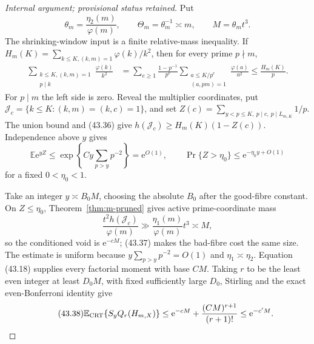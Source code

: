 \documentclass[10pt,reqno]{amsart}
\theoremstyle{definition}
\newcommand{\e}{\mathrm e}
\newcommand{\1}{\mathbf 1}
\begin{document}
\begin{proof}[Internal argument; provisional status retained]
Put
\[
 \theta_m=\frac{\eta_2(m)}{\varphi(m)},\qquad
 \Theta_m=\theta_m^{-1}\asymp m,\qquad M=\theta_mt^3.
\]
The shrinking-window input is a finite relative-mass inequality.  If
$H_m(K)=\sum_{k\leq K,(k,m)=1}\varphi(k)/k^2$, then for every prime
$p\nmid m$,
\begin{equation}\tag{43.36}
 \begin{split}
 \sum_{\substack{k\leq K,(k,m)=1\\p\mid k}}\frac{\varphi(k)}{k^2}
 &=\sum_{e\geq1}\frac{1-p^{-1}}{p^e}
   \sum_{\substack{a\leq K/p^e\\(a,pm)=1}}
        \frac{\varphi(a)}{a^2}
 \leq\frac{H_m(K)}p.
 \end{split}
\end{equation}
For $p\mid m$ the left side is zero.  Reveal the multiplier coordinates,
put $\mathcal J_c=\{k\leq K:(k,m)=(k,c)=1\}$, and set
$Z(c)=\sum_{y<p\leq K,\ p\mid c,\ p\mid L_{m,K}}1/p$.  The union bound
and (43.36) give
$h(\mathcal J_c)\geq H_m(K)(1-Z(c))$.  Independence above $y$ gives
\begin{equation}\tag{43.37}
 \mathbb E\e^{yZ}\leq
 \exp\left\{Cy\sum_{p>y}p^{-2}\right\}=\e^{O(1)},
 \qquad \Pr\{Z>\eta_0\}\leq\e^{-\eta_0y+O(1)}
\end{equation}
for a fixed $0<\eta_0<1$.

Take an integer $y\asymp B_0M$, choosing the absolute $B_0$ after the
good-fibre constant.  On $Z\leq\eta_0$,
Theorem~\ref{thm:m-pruned} gives active prime-coordinate mass
\[
 \frac{t^2h(\mathcal J_c)}{\varphi(m)}
 \gg\frac{\eta_1(m)}{\varphi(m)}t^3\asymp M,
\]
so the conditioned void is $\e^{-cM}$; (43.37) makes the bad-fibre cost the
same size.  The estimate is uniform because
$y\sum_{p>y}p^{-2}=O(1)$ and $\eta_1\asymp\eta_2$.
Equation (43.18) supplies every factorial moment with base $CM$.  Taking
$r$ to be the least even integer at least $D_0M$, with fixed sufficiently
large $D_0$, Stirling and the exact even-Bonferroni identity give
\begin{equation}\tag{43.38}
 \mathbb E_{\rm CRT}\{S_yQ_r(H_{m,X})\}
 \leq\e^{-cM}+\frac{(CM)^{r+1}}{(r+1)!}\leq\e^{-c'M}.
\end{equation}


\end{proof}
\end{document}
